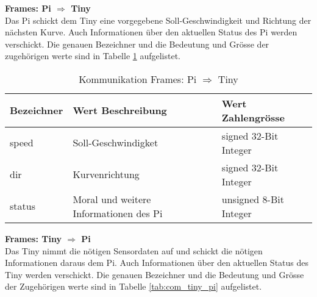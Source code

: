 \documentclass[../../main.tex]{subfiles}
\begin{document}
    \textbf{Frames: Pi $\Rightarrow$ Tiny}\\
    Das Pi schickt dem Tiny eine vorgegebene Soll-Geschwindigkeit und Richtung der nächsten Kurve. Auch Informationen über den aktuellen Status des Pi werden verschickt. Die genauen Bezeichner und die Bedeutung und Grösse der zugehörigen werte sind in Tabelle \ref{tab:com_pi_tiny} aufgelistet.

    \begin{table}[H] \centering
        \begin{tabular}{|l|l|l|}
        \hline
        \textbf{Bezeichner} & \textbf{Wert Beschreibung} & \textbf{Wert Zahlengrösse} \\ \hline
        speed               & Soll-Geschwindigket                     & signed 32-Bit Integer      \\ \hline
        dir                 & Kurvenrichtung                          & signed 32-Bit Integer      \\ \hline
        status              & Moral und weitere Informationen des Pi  & unsigned 8-Bit Integer     \\ \hline
        \end{tabular}

        \caption{Kommunikation Frames: Pi $\Rightarrow$ Tiny}
        \label{tab:com_pi_tiny}
    \end{table}

    \pagebreak
    \textbf{Frames: Tiny $\Rightarrow$ Pi}\\
    Das Tiny nimmt die nötigen Sensordaten auf und schickt die nötigen Informationen daraus dem Pi. Auch Informationen über den aktuellen Status des Tiny werden verschickt. Die genauen Bezeichner und die Bedeutung und Grösse der Zugehörigen werte sind in Tabelle \ref{tab:com_tiny_pi} aufgelistet.
\end{document}
